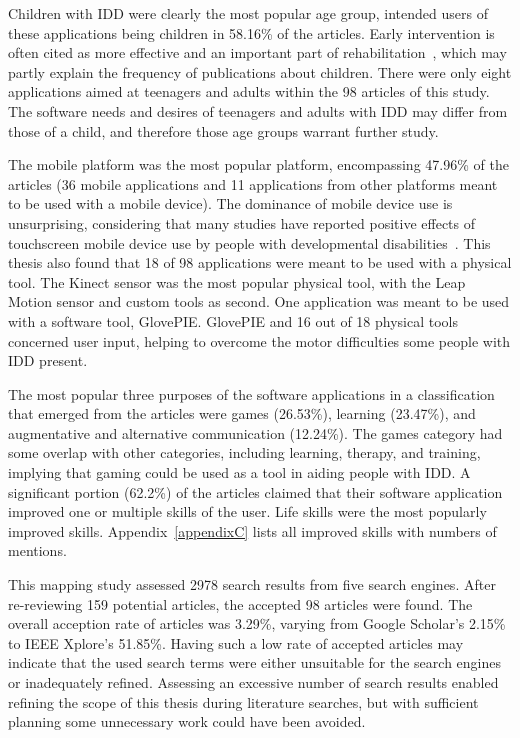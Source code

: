 \documentclass[utf8,english]{gradu3}
\begin{document}
Children with IDD were clearly the most popular age group,
intended users of these applications being children in 58.16\% of the articles.
Early intervention is often cited as more effective and an important part
of rehabilitation~\parencite[e.g.][]{almeida2019, artoni2018technology},
which may partly explain the frequency of publications about children.
There were only eight applications aimed at teenagers and adults within the 98 articles of this study.
The software needs and desires of teenagers and adults with IDD may differ
from those of a child, and therefore those age groups warrant further study.

The mobile platform was the most popular platform,
encompassing 47.96\% of the articles (36 mobile applications and 11 applications from other
platforms meant to be used with a mobile device).
The dominance of mobile device use is unsurprising, considering
that many studies have reported positive effects of touchscreen mobile device use
by people with developmental disabilities~\parencite{stephenson2015}.
This thesis also found that 18 of 98 applications were meant to be used with a physical tool.
The Kinect sensor was the most popular physical tool, with the Leap Motion sensor and
custom tools as second. One application was meant to be used with a software tool, GlovePIE.
GlovePIE and 16 out of 18 physical tools concerned user input,
helping to overcome the motor difficulties some people with IDD present.

The most popular three purposes of the software applications in a classification that emerged from the articles
were games (26.53\%), learning (23.47\%), and augmentative and alternative communication (12.24\%).
The games category had some overlap with other categories, including learning, therapy, and training,
implying that gaming could be used as a tool in aiding people with IDD.
A significant portion (62.2\%) of the articles claimed that their software application
improved one or multiple skills of the user. Life skills were the most popularly improved skills.
Appendix~\ref{appendixC} lists all improved skills with numbers of mentions.

This mapping study assessed 2978 search results from five search engines.
After re-reviewing 159 potential articles, the accepted 98 articles were found.
The overall acception rate of articles was 3.29\%,
varying from Google Scholar's 2.15\% to IEEE Xplore's 51.85\%.
Having such a low rate of accepted articles may indicate that the used search terms
were either unsuitable for the search engines or inadequately refined.
Assessing an excessive number of search results enabled refining the scope of this thesis
during literature searches, but with sufficient planning some unnecessary work
could have been avoided.
\end{document}
